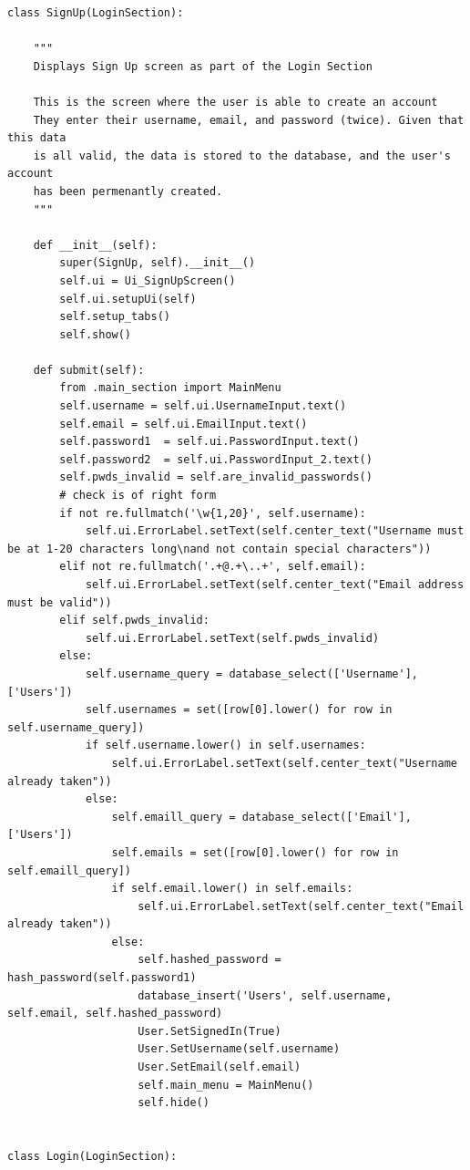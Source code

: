 \documentclass[12pt]{article}
\begin{document}
\begin{lstlisting}
class SignUp(LoginSection):

    """
    Displays Sign Up screen as part of the Login Section

    This is the screen where the user is able to create an account
    They enter their username, email, and password (twice). Given that this data
    is all valid, the data is stored to the database, and the user's account
    has been permenantly created.
    """

    def __init__(self):
        super(SignUp, self).__init__()
        self.ui = Ui_SignUpScreen()
        self.ui.setupUi(self)
        self.setup_tabs()
        self.show()

    def submit(self):
        from .main_section import MainMenu
        self.username = self.ui.UsernameInput.text()
        self.email = self.ui.EmailInput.text()
        self.password1  = self.ui.PasswordInput.text()
        self.password2  = self.ui.PasswordInput_2.text()
        self.pwds_invalid = self.are_invalid_passwords()
        # check is of right form
        if not re.fullmatch('\w{1,20}', self.username):
            self.ui.ErrorLabel.setText(self.center_text("Username must be at 1-20 characters long\nand not contain special characters"))
        elif not re.fullmatch('.+@.+\..+', self.email):
            self.ui.ErrorLabel.setText(self.center_text("Email address must be valid"))
        elif self.pwds_invalid:
            self.ui.ErrorLabel.setText(self.pwds_invalid)
        else:
            self.username_query = database_select(['Username'], ['Users'])
            self.usernames = set([row[0].lower() for row in self.username_query])
            if self.username.lower() in self.usernames:
                self.ui.ErrorLabel.setText(self.center_text("Username already taken"))
            else:
                self.emaill_query = database_select(['Email'], ['Users'])
                self.emails = set([row[0].lower() for row in self.emaill_query])
                if self.email.lower() in self.emails:
                    self.ui.ErrorLabel.setText(self.center_text("Email already taken"))
                else:
                    self.hashed_password = hash_password(self.password1)
                    database_insert('Users', self.username, self.email, self.hashed_password)
                    User.SetSignedIn(True)
                    User.SetUsername(self.username)
                    User.SetEmail(self.email)
                    self.main_menu = MainMenu()
                    self.hide()


class Login(LoginSection):


\end{lstlisting}
\end{document}
